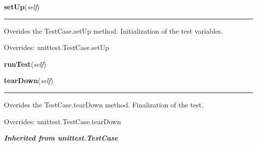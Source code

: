     \vspace{0.5ex}

\hspace{.8\funcindent}\begin{boxedminipage}{\funcwidth}

    \raggedright \textbf{setUp}(\textit{self})

    \vspace{-1.5ex}

    \rule{\textwidth}{0.5\fboxrule}
\setlength{\parskip}{2ex}
    Overides the TestCase.setUp method. Initialization of the test 
    variables.

\setlength{\parskip}{1ex}
      Overrides: unittest.TestCase.setUp

    \end{boxedminipage}

    \label{nMOLDYN:Tests:StabilityTests:AnalysisTest:runTest}

    \vspace{0.5ex}

\hspace{.8\funcindent}\begin{boxedminipage}{\funcwidth}

    \raggedright \textbf{runTest}(\textit{self})

\setlength{\parskip}{2ex}
\setlength{\parskip}{1ex}
    \end{boxedminipage}

    \vspace{0.5ex}

\hspace{.8\funcindent}\begin{boxedminipage}{\funcwidth}

    \raggedright \textbf{tearDown}(\textit{self})

    \vspace{-1.5ex}

    \rule{\textwidth}{0.5\fboxrule}
\setlength{\parskip}{2ex}
    Overides the TestCase.tearDown method. Finalization of the test.

\setlength{\parskip}{1ex}
      Overrides: unittest.TestCase.tearDown

    \end{boxedminipage}


\large{\textbf{\textit{Inherited from unittest.TestCase}}}

